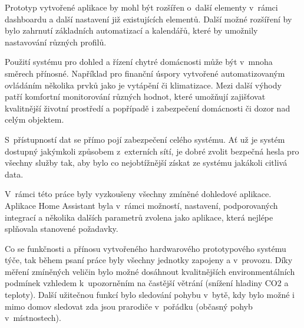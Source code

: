Prototyp vytvořené aplikace by mohl být rozšířen o~další elementy v~rámci dashboardu a další nastavení již existujících elementů. Další možné rozšíření by bylo zahrnutí základních automatizací a kalendářů, které by umožnily nastavování různých profilů.

Použití systému pro dohled a řízení chytré domácnosti může být v~mnoha směrech přínosné. Například pro finanční úspory vytvořené automatizovaným ovládáním několika prvků jako je vytápění či klimatizace. Mezi další výhody patří komfortní monitorování různých hodnot, které umožňují zajišťovat kvalitnější životní prostředí a popřípadě i zabezpečení domácnosti či dozor nad celým objektem.

S~přístupností dat se přímo pojí zabezpečení celého systému. Ať už je systém dostupný jakýmkoli způsobem z~externích sítí, je dobré zvolit bezpečná hesla pro všechny služby tak, aby bylo co nejobtížnější získat ze systému jakákoli citlivá data.

V~rámci této práce byly vyzkoušeny všechny zmíněné dohledové aplikace. Aplikace Home Assistant byla v~rámci možností, nastavení, podporovaných integrací a několika dalších parametrů zvolena jako aplikace, která nejlépe splňovala stanovené požadavky.

Co se funkčnosti a přínosu vytvořeného hardwarového prototypového systému týče, tak během psaní práce byly všechny jednotky zapojeny a v~provozu. Díky měření zmíněných veličin bylo možné dosáhnout kvalitnějších environmentálních podmínek vzhledem k~upozorněním na častější větrání (snížení hladiny CO2 a teploty). Další užitečnou funkcí bylo sledování pohybu v~bytě, kdy bylo možné i mimo domov sledovat zda jsou prarodiče v~pořádku (občasný pohyb v~místnostech).  


